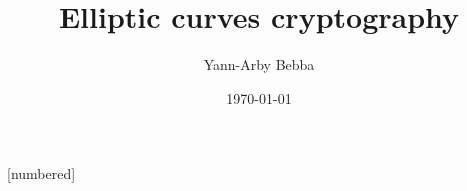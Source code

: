 [numbered]

\usepackage[english]{babel}
\usepackage[utf8]{inputenc}
\usepackage[T1]{fontenc}
\usepackage{booktabs}
\usepackage{graphicx}
\usepackage{caption}
\usepackage{wrapfig}
\usepackage[export]{adjustbox}
\usepackage{hyperref}

\usepackage[
backend=biber,
]{biblatex}

\hypersetup{
    colorlinks=true,
    linkcolor=black,
    urlcolor=blue,
    citecolor=magenta
}

\usepackage{amsmath, amsfonts, mathtools, amsthm, amssymb, wasysym}
\usepackage{mathrsfs}
\usepackage{cancel}
\usepackage{bm}

\newcommand\N{\ensuremath{\mathbb{N}}}
\newcommand\R{\ensuremath{\mathbb{R}}}
\newcommand\Z{\ensuremath{\mathbb{Z}}}
\renewcommand\O{\ensuremath{\emptyset}}
\newcommand\Q{\ensuremath{\mathbb{Q}}}
\newcommand\C{\ensuremath{\mathbb{C}}}
\newcommand\K{\ensuremath{\mathbb{K}}}

\newcommand\congru{\ensuremath{\equiv}}
\newcommand\et{\ensuremath{\wedge}}
\newcommand\ou{\ensuremath{\vee}}


\graphicspath{ {./figures}}

\title[Elliptics curves]{Elliptic curves cryptography}

\author{Yann-Arby Bebba}
\date{\today}
